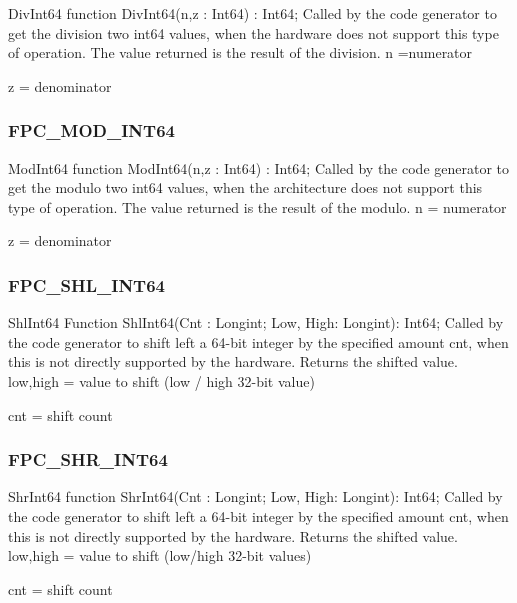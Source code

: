 \documentclass [a4paper,12pt]{article}
\begin{document}
\begin{function}{DivInt64}
\Declaration
function DivInt64(n,z : Int64) : Int64;
\Description
Called by the code generator to get the division two int64 values, when the
hardware does not support this type of operation. The value returned is the
result of the division.
\Parameters
n =numerator \par
z = denominator
\end{function}

\subsubsection{FPC{\_}MOD{\_}INT64}
\label{subsubsec:mylabel100}

\begin{function}{ModInt64}
\Declaration
function ModInt64(n,z : Int64) : Int64;
\Description
Called by the code generator to get the modulo two int64 values, when the
architecture does not support this type of operation. The value returned is
the result of the modulo.
\Parameters
n = numerator \par
z = denominator
\end{function}

\subsubsection{FPC{\_}SHL{\_}INT64}
\label{subsubsec:mylabel101}

\begin{function}{ShlInt64}
\Declaration
Function ShlInt64(Cnt : Longint; Low, High: Longint): Int64;
\Description
Called by the code generator to shift left a 64-bit integer by the specified
amount cnt, when this is not directly supported by the hardware. Returns the
shifted value.
\Parameters
low,high = value to shift (low / high 32-bit value) \par
cnt = shift count
\end{function}

\subsubsection{FPC{\_}SHR{\_}INT64}
\label{subsubsec:mylabel102}

\begin{function}{ShrInt64}
\Declaration
function ShrInt64(Cnt : Longint; Low, High: Longint): Int64;
\Description
Called by the code generator to shift left a 64-bit integer by the specified
amount cnt, when this is not directly supported by the hardware. Returns the
shifted value.
\Parameters
low,high = value to shift (low/high 32-bit values) \par
cnt = shift count
\end{function}
\end{document}
